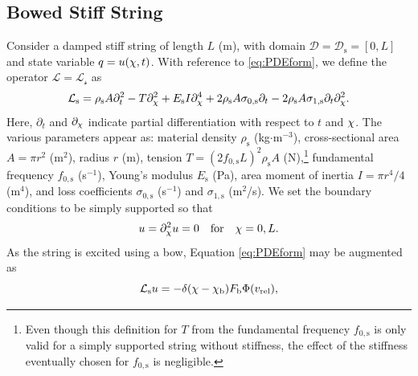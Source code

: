     \subsection{Bowed Stiff String}
    Consider a damped stiff string of length $L$ (m), with domain $\mathcal{D} = \mathcal{D}_\text{s} = [0,L]$ and state variable $q = u(\chi,t)$.  
    With reference to \eqref{eq:PDEform}, we define the operator $\mathcal{L} = \mathcal{L_\text{s}}$ as \cite{bilbao2009numerical}
    \begin{equation}
        \mathcal{L}_\text{s} = \rho_\text{s} A \partial_t^2 - T\partial_\chi^2 + E_\text{s}I\partial_\chi^4+2\rho_\text{s} A\sigma_{0,\text{s}}\partial_t-2\rho_\text{s} A\sigma_{1,\text{s}}\partial_t\partial_\chi^2.
    \end{equation}
    Here, $\partial_{t}$ and $\partial_{\chi}$ indicate partial differentiation with respect to $t$ and $\chi$. The various parameters appear as: material density $\rho_\text{s}$ (kg$\cdot$m$^{-3}$), cross-sectional area $A = \pi r^2$ (m$^2$), radius $r$ (m), tension $T = (2f_{0,\text{s}}L)^2\rho_\text{s}A$ (N),\footnote{Even though this definition for $T$ from the fundamental frequency $f_{0,\text{s}}$ is only valid for a simply supported string without stiffness, the effect of the stiffness eventually chosen for $f_{0,\text{s}}$ is negligible.} %
    fundamental frequency $f_{0,\text{s}}$ (s$^{-1}$), Young's modulus $E_\text{s}$ (Pa), area moment of inertia $I=\pi r^4 / 4$ (m$^4$), and loss coefficients $\sigma_{0,\text{s}}$ (s$^{-1}$) and $\sigma_{1,\text{s}}$ (m$^2$/s). We set the boundary conditions to be simply supported so that
    \begin{equation}\label{eq:boundary}
        u = \partial_\chi^2u = 0 \quad \text{for} \quad \chi = 0, L.
    \end{equation}
    As the string is excited using a bow, Equation \eqref{eq:PDEform} may be augmented as \cite{bilbao2009numerical}
    \begin{equation}\label{eq:bowedString}
        \mathcal{L}_\text{s}u = -\delta(\chi-\chi_\text{b})F_\text{b}\Phi(v_\text{rel}),
    \end{equation}
